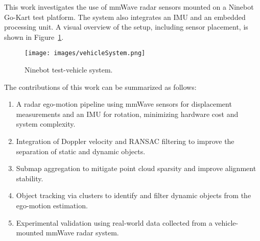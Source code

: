 This work investigates the use of mmWave radar sensors mounted on a Ninebot Go-Kart \cite{ninebot_product_page} test platform.  
The system also integrates an IMU and an embedded processing unit.  
A visual overview of the setup, including sensor placement, is shown in Figure~\ref{fig:Ninebot_system}.  

\begin{figure}[!htbp]
    \centering
    \texttt{[image: images/vehicleSystem.png]}
    \caption{Ninebot test-vehicle system.}
    \label{fig:Ninebot_system}
\end{figure}

\newpage
The contributions of this work can be summarized as follows:  
\begin{enumerate}
    \item A radar ego-motion pipeline using mmWave sensors for displacement measurements and an IMU for rotation, minimizing hardware cost and system complexity.
    \item Integration of Doppler velocity and RANSAC filtering to improve the separation of static and dynamic objects.
    \item Submap aggregation to mitigate point cloud sparsity and improve alignment stability.
    \item Object tracking via clusters to identify and filter dynamic objects from the ego-motion estimation.
    \item Experimental validation using real-world data collected from a vehicle-mounted mmWave radar system.  
\end{enumerate}
